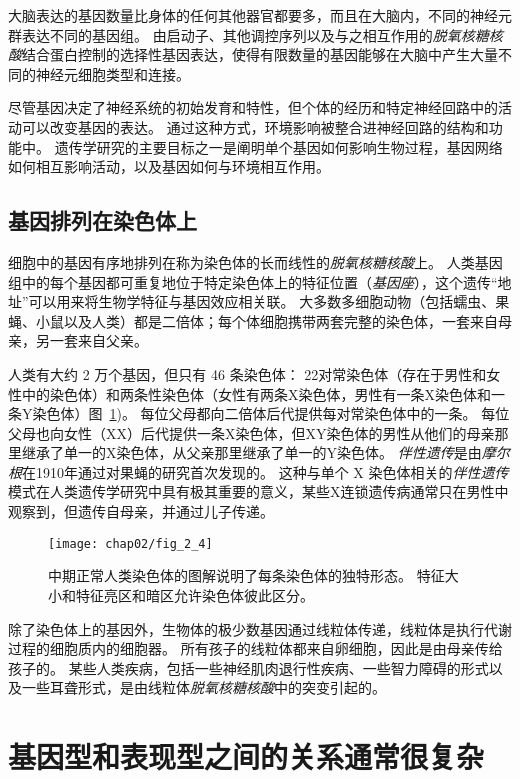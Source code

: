 大脑表达的基因数量比身体的任何其他器官都要多，而且在大脑内，不同的神经元群表达不同的基因组。
由启动子、其他调控序列以及与之相互作用的\textit{脱氧核糖核酸}结合蛋白控制的选择性基因表达，使得有限数量的基因能够在大脑中产生大量不同的神经元细胞类型和连接。



尽管基因决定了神经系统的初始发育和特性，但个体的经历和特定神经回路中的活动可以改变基因的表达。
通过这种方式，环境影响被整合进神经回路的结构和功能中。
遗传学研究的主要目标之一是阐明单个基因如何影响生物过程，基因网络如何相互影响活动，以及基因如何与环境相互作用。



\subsection{基因排列在染色体上}

细胞中的基因有序地排列在称为染色体的长而线性的\textit{脱氧核糖核酸}上。
人类基因组中的每个基因都可重复地位于特定染色体上的特征位置（\textit{基因座}），这个遗传“地址”可以用来将生物学特征与基因效应相关联。
大多数多细胞动物（包括蠕虫、果蝇、小鼠以及人类）都是二倍体；每个体细胞携带两套完整的染色体，一套来自母亲，另一套来自父亲。


人类有大约 2 万个基因，但只有 46 条染色体：
22对常染色体（存在于男性和女性中的染色体）和两条性染色体（女性有两条X染色体，男性有一条X染色体和一条Y染色体）图~\ref{fig:2_4})。
每位父母都向二倍体后代提供每对常染色体中的一条。
每位父母也向女性（XX）后代提供一条X染色体，但XY染色体的男性从他们的母亲那里继承了单一的X染色体，从父亲那里继承了单一的Y染色体。
\textit{伴性遗传}是由\textit{摩尔根}在1910年通过对果蝇的研究首次发现的。
这种与单个 X 染色体相关的\textit{伴性遗传}模式在人类遗传学研究中具有极其重要的意义，某些X连锁遗传病通常只在男性中观察到，但遗传自母亲，并通过儿子传递。


\begin{figure}[htbp]
	\centering
	\texttt{[image: chap02/fig\_2\_4]}
	\caption{中期正常人类染色体的图解说明了每条染色体的独特形态。
		特征大小和特征亮区和暗区允许染色体彼此区分\cite{watoson1983recombinant}。}
	\label{fig:2_4}
\end{figure}


除了染色体上的基因外，生物体的极少数基因通过线粒体传递，线粒体是执行代谢过程的细胞质内的细胞器。
所有孩子的线粒体都来自卵细胞，因此是由母亲传给孩子的。
某些人类疾病，包括一些神经肌肉退行性疾病、一些智力障碍的形式以及一些耳聋形式，是由线粒体\textit{脱氧核糖核酸}中的突变引起的。


\section{基因型和表现型之间的关系通常很复杂}

